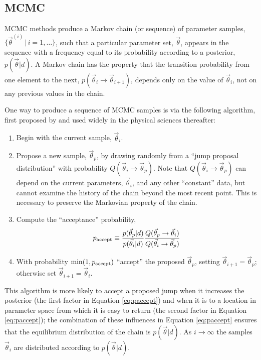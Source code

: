 \documentclass[prd,preprint]{revtex4}
\newcommand{\vtheta}{\vec{\theta}}
\begin{document}
\subsection{MCMC}

MCMC methods produce a Markov chain (or sequence) of parameter
samples, $\{ \vtheta^(i) \, | \, i = 1, \ldots \}$, such that a particular
parameter set, $\vtheta$, appears in the sequence with a frequency
equal to its probability according to a posterior, $p(\vtheta|d)$.  A
Markov chain has the property that the transition probability from one
element to the next, $p(\vtheta_i \to \vtheta_{i+1})$, depends only on
the value of $\vtheta_i$, not on any previous values in the chain.

One way to produce a sequence of MCMC samples is via the following
algorithm, first proposed by \citet{Metropolis1953} and used widely in
the physical sciences thereafter:
\begin{enumerate}
  \item Begin with the current sample, $\vtheta_i$.
  \item Propose a new sample, $\vtheta_p$, by drawing randomly from a
    ``jump proposal distribution'' with probability $Q(\vtheta_i \to
    \vtheta_p)$.  Note that $Q(\vtheta_i \to \vtheta_p)$ can depend on
    the current parameters, $\vtheta_i$, and any other ``constant''
    data, but cannot examine the history of the chain beyond the most
    recent point.  This is necessary to preserve the Markovian
    property of the chain.
  \item Compute the ``acceptance'' probability,
    \begin{equation}
      \label{eq:paccept}
      p_{\textnormal{accept}} \equiv
      \frac{p(\vtheta_p|d)}{p(\vtheta_i|d)} \frac{Q(\vtheta_p \to
        \vtheta_i)}{Q(\vtheta_i \to \vtheta_p)}
    \end{equation}
  \item With probability $\min(1,p_{\textnormal{accept}})$ ``accept''
    the proposed $\vtheta_p$, setting $\vtheta_{i+1} = \vtheta_p$;
    otherwise set $\vtheta_{i+1} = \vtheta_i$.
\end{enumerate}
This algorithm is more likely to accept a proposed jump when it
increases the posterior (the first factor in Equation
\eqref{eq:paccept}) and when it is to a location in parameter space
from which it is easy to return (the second factor in Equation
\eqref{eq:paccept}); the combination of these influences in Equation
\eqref{eq:paccept} ensures that the equilibrium distribution of the
chain is $p(\vtheta|d)$.  As $i \to \infty$ the samples $\vtheta_i$
are distributed according to $p(\vtheta|d)$.  
\end{document}
